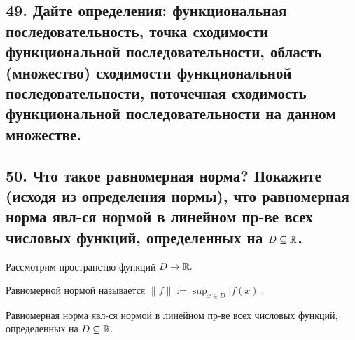 \documentclass[a4paper, fleqn]{article}
\begin{document}
        
    \subsection*{49. Дайте определения: функциональная последовательность, точка сходимости функциональной последовательности, область (множество) сходимости функциональной последовательности, поточечная сходимость функциональной последовательности на данном множестве.}
   
   
    \subsection*{50. Что такое равномерная норма? Покажите (исходя из определения нормы), что равномерная норма явл-ся нормой в линейном пр-ве всех числовых функций, определенных на $D \subseteq \mathbb{R}$.}
    
    Рассмотрим пространство функций $D \to \mathbb{R}.$
    
    Равномерной нормой называется $\displaystyle \|f\| := \sup_{x \in D} |f(x)|.$
    
    Равномерная норма явл-ся нормой в линейном пр-ве всех числовых функций, определенных на $D \subseteq \mathbb{R}.$
    
\end{document}
